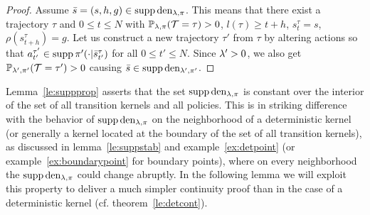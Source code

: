 \begin{proof}
Assume $\bar{s} = (s,h,g) \in \operatorname*{\mathrm{supp}} \mathrm{den}_{\mathit{\lambda},\pi}$. This means
that there exist a trajectory $\tau$ and $0 \leq t \leq N$ with $\mathbb{P}_{\mathit{\lambda},\pi}(\mathcal{T}=\tau) >0$,
$l(\tau) \geq t+h$, $s_t^{\tau} = s$, $\rho(s_{t+h}^{\tau})=g$.
Let us construct a new trajectory $\tau'$ from $\tau$ by altering
actions so that $a_{t'}^{\tau'} \in \operatorname*{\mathrm{supp}} \pi'(\cdot|\bar{s}_{t'}^{\tau})$
for all $0\leq t'\leq N$. Since $\mathit{\lambda}'>0$, we also get
$\mathbb{P}_{\mathit{\lambda}',\pi'}(\mathcal{T}=\tau') >0$ causing
$\bar{s}  \in \operatorname*{\mathrm{supp}} \mathrm{den}_{\mathit{\lambda}',\pi'}$.



\end{proof}
Lemma~\ref{le:suppprop} asserts
that the set $\operatorname*{\mathrm{supp}} \mathrm{den}_{\mathit{\lambda},\pi}$ is constant over the interior of the set of all transition kernels and all policies.
This is in striking difference with the behavior of $\operatorname*{\mathrm{supp}} \mathrm{den}_{\mathit{\lambda},\pi}$ on the neighborhood of a deterministic kernel (or generally a kernel located at the boundary of the set of all transition kernels), as discussed in lemma~\ref{le:suppstab} and example~\ref{ex:detpoint} (or example~\ref{ex:boundarypoint} for boundary points), where on every neighborhood the $\operatorname*{\mathrm{supp}} \mathrm{den}_{\mathit{\lambda},\pi}$ could change abruptly.
In the following lemma we will exploit this property to deliver a much simpler continuity proof than in the case of a deterministic kernel (cf. theorem~\ref{le:detcont}).


